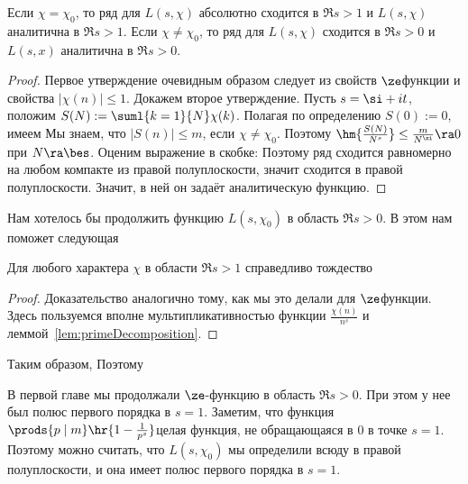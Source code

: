 \documentclass[a4paper]{article}
\begin{document}
\begin{lemma}
Если $\chi=\chi_0$, то ряд для $L(s,\chi)$ абсолютно сходится в $\Re s>1$ и $L(s,\chi)$ аналитична в $\Re s>1$.
Если $\chi\neq \chi_0$, то ряд для $L(s,\chi)$ сходится в $\Re s>0$ и $L(s,x)$ аналитична в $\Re s>0$.
\end{lemma}
\begin{proof}
Первое утверждение очевидным образом следует из свойств $\ze$\д функции и свойства $|\chi(n)|\le1$.
Докажем второе утверждение. Пусть $s=\si+it$, положим $S(N):=\suml{k=1}{N}\chi(k)$. Полагая по определению $S(0) := 0$, имеем
Мы знаем, что $|S(n)|\le m$, если $\chi\neq \chi_0$. Поэтому
$\hm{\frac{S(N)}{N^s}}\le\frac{m}{N^{\si}}\ra 0$ при $N\ra\bes$.
Оценим выражение в скобке:
Поэтому ряд сходится равномерно на любом компакте из правой полуплоскости, значит сходится в правой
полуплоскости. Значит, в ней он задаёт аналитическую функцию.
\end{proof}

Нам хотелось бы продолжить функцию $L(s,\chi_0)$ в область $\Re s>0$. В этом нам поможет следующая
\begin{lemma} Для любого характера $\chi$ в области $\Re s>1$ справедливо тождество
\end{lemma}
\begin{proof}
Доказательство аналогично тому, как мы это делали для $\ze$\д функции. Здесь пользуемся вполне
мультипликативностью функции $\frac{\chi(n)}{n^s}$ и леммой~\ref{lem:primeDecomposition}.
\end{proof}

Таким образом,
Поэтому

В первой главе мы продолжали $\ze$-функцию в область $\Re s>0$. При этом у нее был полюс первого порядка в $s=1$.
Заметим, что функция $\prods{p\mid m}\hr{1-\frac{1}{p^s}}$\т целая функция, не обращающаяся в $0$
в точке $s=1$. Поэтому можно считать, что $L(s,\chi_0)$ мы определили всюду в правой полуплоскости,
и она имеет полюс первого порядка в $s=1$.
\end{document}
